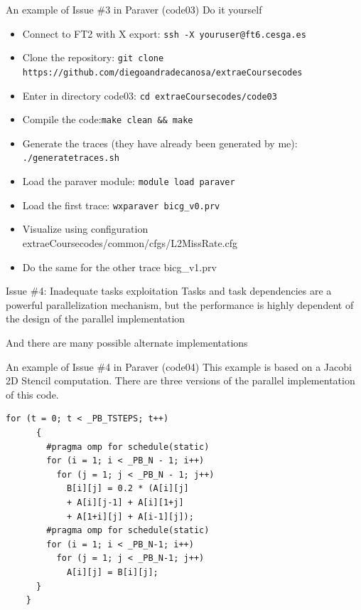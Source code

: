 \documentclass[10pt,xcolor=table]{beamer}
\begin{document}
\begin{frame}{An example of Issue \#3 in Paraver (code03)}
Do it yourself
\begin{itemize}
    \item Connect to FT2 with X export: {\tt ssh -X youruser@ft6.cesga.es}
    \item Clone the repository: {\tt git clone https://github.com/diegoandradecanosa/extraeCoursecodes}
    \item Enter in directory code03: {\tt cd extraeCoursecodes/code03}
        \item Compile the code:{\tt make clean && make}
    \item Generate the traces (they have already been generated by me): {\tt ./generatetraces.sh}
    \item Load the paraver module:  {\tt module load paraver}
    \item Load the first trace: {\tt wxparaver bicg\_v0.prv}
    \item Visualize using configuration extraeCoursecodes/common/cfgs/L2MissRate.cfg 
    \item Do the same for the other trace bicg\_v1.prv
\end{itemize}
\end{frame}

\begin{frame}{Issue \#4: Inadequate tasks exploitation}
Tasks and task dependencies are a powerful parallelization mechanism, but the performance is highly dependent of the design of the parallel implementation

And there are many possible alternate implementations
\end{frame}

\begin{frame}[fragile]{An example of Issue \#4 in Paraver (code04)}
This example is based on a Jacobi 2D Stencil computation. There are three versions of the parallel implementation of this code. 
\begin{lstlisting}[style=shell,basicstyle=\scriptsize\ttfamily,gobble=3,caption={Parallelized with for pragmas (v0)}]
     for (t = 0; t < _PB_TSTEPS; t++)
      {
        #pragma omp for schedule(static) 
        for (i = 1; i < _PB_N - 1; i++)
          for (j = 1; j < _PB_N - 1; j++)
            B[i][j] = 0.2 * (A[i][j] 
            + A[i][j-1] + A[i][1+j] 
            + A[1+i][j] + A[i-1][j]);
        #pragma omp for schedule(static) 
        for (i = 1; i < _PB_N-1; i++)
          for (j = 1; j < _PB_N-1; j++)
            A[i][j] = B[i][j];
      }
    }
  \end{lstlisting}
\end{frame}
\end{document}
